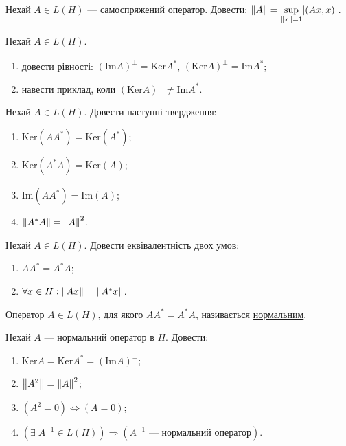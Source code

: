 
\begin{exercise}
    Нехай $A \in L(H)$ --- самоспряжений оператор.
    Довести: $\left\lVert A\right\rVert = \underset{\left\lVert x\right\rVert = 1}{\sup}|(Ax, x)|$.
\end{exercise}

\begin{exercise}
    Нехай $A \in L(H)$.
    \begin{enumerate}[label=\ukr*)]
        \item довести рівності: $(\mathrm{Im}A)^\perp = \mathrm{Ker}A^*$, $(\mathrm{Ker}A)^\perp = \overline{\mathrm{Im}A^*}$;
        \item навести приклад, коли $(\mathrm{Ker}A)^\perp \neq \mathrm{Im}A^*$.
    \end{enumerate}
\end{exercise}

\begin{exercise}\label{N:1_3_12}
    Нехай $A \in L(H)$. Довести наступні твердження:
    \begin{enumerate}[label=\ukr*)]
        \item $\mathrm{Ker}(A A^*) = \mathrm{Ker}(A^*)$;
        \item $\mathrm{Ker}(A^* A) = \mathrm{Ker}(A)$;
        \item $\overline{\mathrm{Im} (A A^*)} = \overline{\mathrm{Im} (A)}$;
        \item\label{N:1_3_12_h} $\left\lVert A^* A\right\rVert = \left\lVert A\right\rVert^2$.
    \end{enumerate}
\end{exercise}

\begin{exercise}
    Нехай $A \in L(H)$. Довести еквівалентність двох умов:
    \begin{enumerate}[label=\ukr*)]
        \item $A A^* = A^* A$;
        \item $\forall x \in H : \left\lVert Ax\right\rVert = \left\lVert A^{*}x\right\rVert$.
    \end{enumerate}
\end{exercise}

\begin{theory}
    Оператор $A \in L(H)$, для якого $A A^* = A^* A$, називається \uline{нормальним}.
\end{theory}

\begin{exercise}\label{N:1_3_14}
    Нехай $A$ --- нормальний оператор в $H$. Довести:
    \begin{enumerate}[label=\ukr*)]
        \item $\mathrm{Ker} A = \mathrm{Ker} A^* = (\mathrm{Im} A)^\perp$;
        \item $\left\lVert A^2\right\rVert = \left\lVert A\right\rVert^2$;
        \item $(A^2 = 0) \Leftrightarrow (A = 0)$;
        \item $\left( \exists \; A^{-1} \in L(H)\right) \Rightarrow (A^{-1} \text{ --- нормальний оператор})$.
    \end{enumerate}
\end{exercise}

